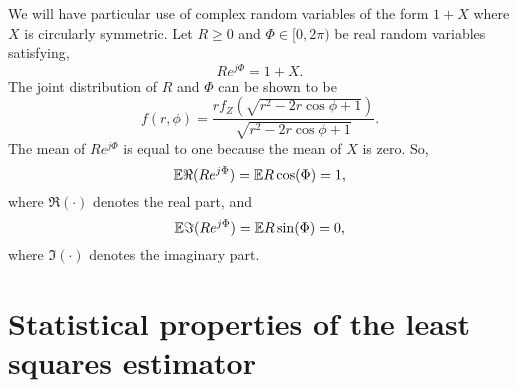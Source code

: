 \documentclass[journal]{IEEEtran}
\begin{document}
We will have particular use of complex random variables of the form $1 + X$ where $X$ is circularly symmetric.  Let $R \geq 0$ and $\Phi \in [0,2\pi)$ be real random variables satisfying, 
\[
R e^{j\Phi} = 1 + X.
\]
The joint distribution of $R$ and $\Phi$ can be shown to be
\[
f(r,\phi) = \frac{r f_Z(\sqrt{r^2 - 2r\cos\phi + 1})}{\sqrt{r^2 - 2r\cos\phi + 1}}.
\]
The mean of $R e^{j\Phi}$ is equal to one because the mean of $X$ is zero.  So,
\[
{\mathbb E} \Re(R e^{j\Phi}) = {\mathbb E} R \cos(\Phi) = 1,
\]
where $\Re(\cdot)$ denotes the real part, and
\[
{\mathbb E} \Im(R e^{j\Phi}) = {\mathbb E} R \sin(\Phi) = 0,
\]
where $\Im(\cdot)$ denotes the imaginary part.  %




\section{Statistical properties of the least squares estimator}\label{sec:stat-prop-least}
\end{document}
